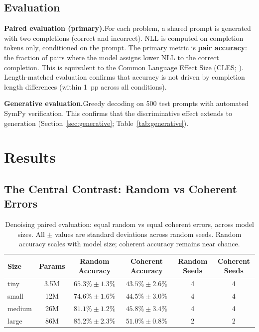 \documentclass{article}
\begin{document}
\subsection{Evaluation}
\label{sec:evaluation}

\textbf{Paired evaluation (primary).}\quad For each problem, a shared prompt is generated with two completions (correct and incorrect). NLL is computed on completion tokens only, conditioned on the prompt. The primary metric is \textbf{pair accuracy}: the fraction of pairs where the model assigns lower NLL to the correct completion. This is equivalent to the Common Language Effect Size (CLES; \citealp{mcgraw1992common}). Length-matched evaluation confirms that accuracy is not driven by completion length differences (within 1~pp across all conditions).

\textbf{Generative evaluation.}\quad Greedy decoding on 500 test prompts with automated SymPy verification. This confirms that the discriminative effect extends to generation (Section~\ref{sec:generative}; Table~\ref{tab:generative}).

\section{Results}
\label{sec:results}

\subsection{The Central Contrast: Random vs Coherent Errors}
\label{sec:central}

\begin{table}[t]
\centering
\begin{tabular}{lccccc}
\toprule
Size & Params & Random Accuracy & Coherent Accuracy & Random Seeds & Coherent Seeds \\
\midrule
tiny   & 3.5M & $\mathbf{65.3\% \pm 1.3\%}$ & $43.5\% \pm 2.6\%$ & 4 & 4 \\
small  & 12M  & $\mathbf{74.6\% \pm 1.6\%}$ & $44.5\% \pm 3.0\%$ & 4 & 4 \\
medium & 26M  & $\mathbf{81.1\% \pm 1.2\%}$ & $45.8\% \pm 3.4\%$ & 4 & 4 \\
large  & 86M  & $\mathbf{85.2\% \pm 2.3\%}$ & $51.0\% \pm 0.8\%$ & 2 & 2 \\
\bottomrule
\end{tabular}
\caption{Denoising paired evaluation: equal random vs equal coherent errors, across model sizes. All $\pm$ values are standard deviations across random seeds. Random accuracy scales with model size; coherent accuracy remains near chance.}
\label{tab:central}
\end{table}
\end{document}
